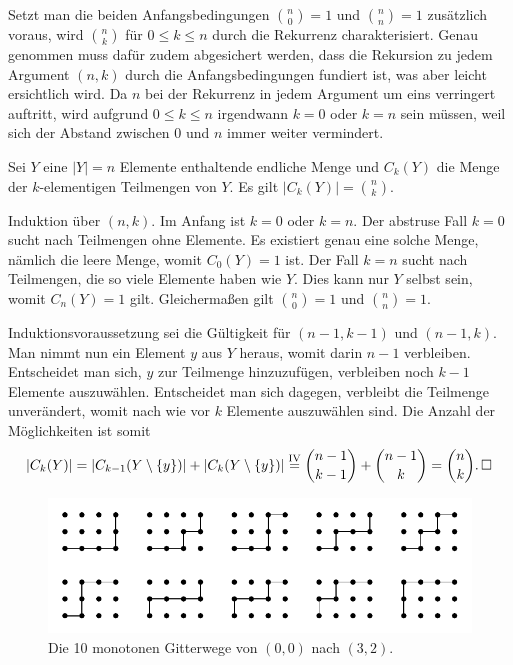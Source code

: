 \noindent
Setzt man die beiden Anfangsbedingungen $\binom{n}{0} = 1$ und $\binom{n}{n}=1$
zusätzlich voraus, wird $\binom{n}{k}$ für $0\le k\le n$ durch die
Rekurrenz charakterisiert. Genau genommen muss dafür zudem abgesichert
werden, dass die Rekursion zu jedem Argument $(n,k)$ durch die
Anfangsbedingungen fundiert ist, was aber leicht ersichtlich wird.
Da $n$ bei der Rekurrenz in jedem Argument um eins verringert
auftritt, wird aufgrund $0\le k\le n$ irgendwann $k=0$ oder $k=n$
sein müssen, weil sich der Abstand zwischen 0 und $n$ immer weiter vermindert.

\begin{Satz}\newlinefirst
Sei $Y$ eine $|Y|=n$ Elemente enthaltende endliche Menge und $C_k(Y)$
die Menge der $k$-elementigen Teilmengen von $Y$.
Es gilt $|C_k(Y)| = \binom{n}{k}$.
\end{Satz}
\begin{Beweis}
Induktion über $(n, k)$. Im Anfang ist $k=0$ oder $k=n$. Der abstruse
Fall $k=0$ sucht nach Teilmengen ohne Elemente. Es existiert genau eine
solche Menge, nämlich die leere Menge, womit $C_0(Y)=1$ ist. Der Fall
$k=n$ sucht nach Teilmengen, die so viele Elemente haben wie $Y$.
Dies kann nur $Y$ selbst sein, womit $C_n(Y)=1$ gilt.
Gleichermaßen gilt $\binom{n}{0}=1$ und $\binom{n}{n}=1$.

Induktionsvoraussetzung sei die Gültigkeit für $(n-1, k-1)$ und
$(n-1, k)$. Man nimmt nun ein Element $y$ aus $Y$ heraus,
womit darin $n-1$ verbleiben. Entscheidet man sich,
$y$ zur Teilmenge hinzuzufügen, verbleiben noch $k-1$ Elemente
auszuwählen. Entscheidet man sich dagegen, verbleibt die Teilmenge
unverändert, womit nach wie vor $k$ Elemente auszuwählen sind.
Die Anzahl der Möglichkeiten ist somit
\[|C_k(Y)| = |C_{k-1}(Y\setminus\{y\})| + |C_k(Y\setminus\{y\})|
\stackrel{\mathrm{IV}}=\binom{n-1}{k-1} + \binom{n-1}{k}
= \binom{n}{k}.\,\Box\]
\end{Beweis}

\begin{figure}\setlength{\abovecaptionskip}{0pt}
\begin{center}
\includegraphics[width=125mm]{img/Gitterwege.pdf}
\caption{Die 10 monotonen Gitterwege von $(0,0)$ nach $(3,2)$.}
\label{fig:Gitterwege}
\end{center}
\end{figure}

